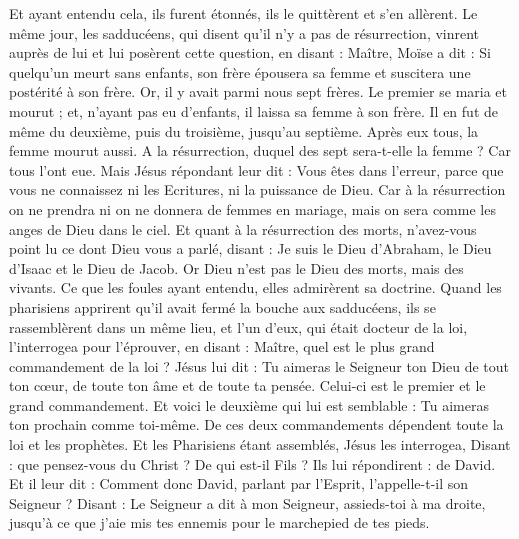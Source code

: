\begin{multicols}{2}
Et ayant entendu cela, ils furent étonnés, ils le quittèrent et s'en allèrent.
Le même jour, les sadducéens, qui disent qu'il n'y a pas de résurrection, vinrent auprès de lui et lui posèrent cette question,
en disant : Maître, Moïse a dit : Si quelqu'un meurt sans enfants, son frère épousera sa femme et suscitera une postérité à son frère.
Or, il y avait parmi nous sept frères. Le premier se maria et mourut ; et, n'ayant pas eu d'enfants, il laissa sa femme à son frère.
Il en fut de même du deuxième, puis du troisième, jusqu'au septième.
Après eux tous, la femme mourut aussi.
A la résurrection, duquel des sept sera-t-elle la femme ? Car tous l'ont eue.
Mais Jésus répondant leur dit : Vous êtes dans l'erreur, parce que vous ne connaissez ni les Ecritures, ni la puissance de Dieu.
Car à la résurrection on ne prendra ni on ne donnera de femmes en mariage, mais on sera comme les anges de Dieu dans le ciel.
Et quant à la résurrection des morts, n'avez-vous point lu ce dont Dieu vous a parlé, disant :
Je suis le Dieu d'Abraham, le Dieu d'Isaac et le Dieu de Jacob. Or Dieu n'est pas le Dieu des morts, mais des vivants.
Ce que les foules ayant entendu, elles admirèrent sa doctrine.
Quand les pharisiens apprirent qu'il avait fermé la bouche aux sadducéens, ils se rassemblèrent dans un même lieu,
et l'un d'eux, qui était docteur de la loi, l'interrogea pour l'éprouver, en disant :
Maître, quel est le plus grand commandement de la loi ?
Jésus lui dit : Tu aimeras le Seigneur ton Dieu de tout ton cœur, de toute ton âme et de toute ta pensée.
Celui-ci est le premier et le grand commandement.
Et voici le deuxième qui lui est semblable : Tu aimeras ton prochain comme toi-même.
De ces deux commandements dépendent toute la loi et les prophètes.
Et les Pharisiens étant assemblés, Jésus les interrogea,
Disant : que pensez-vous du Christ ? De qui est-il Fils ? Ils lui répondirent : de David.
Et il leur dit : Comment donc David, parlant par l'Esprit, l'appelle-t-il son Seigneur ? Disant :
Le Seigneur a dit à mon Seigneur, assieds-toi à ma droite, jusqu'à ce que j'aie mis tes ennemis pour le marchepied de tes pieds.

\end{multicols}
